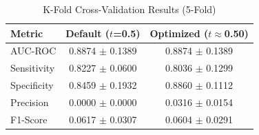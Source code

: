 \begin{table}[h]
\centering
\caption{K-Fold Cross-Validation Results (5-Fold)}
\label{tab:kfold_results}
\begin{tabular}{lcc}
\toprule
\textbf{Metric} & \textbf{Default ($t$=0.5)} & \textbf{Optimized ($t$$\approx$0.50)} \\
\midrule
AUC-ROC & 0.8874 $\pm$ 0.1389 & 0.8874 $\pm$ 0.1389 \\
Sensitivity & 0.8227 $\pm$ 0.0600 & 0.8036 $\pm$ 0.1299 \\
Specificity & 0.8459 $\pm$ 0.1932 & 0.8860 $\pm$ 0.1112 \\
Precision & 0.0000 $\pm$ 0.0000 & 0.0316 $\pm$ 0.0154 \\
F1-Score & 0.0617 $\pm$ 0.0307 & 0.0604 $\pm$ 0.0291 \\
\bottomrule
\end{tabular}
\end{table}